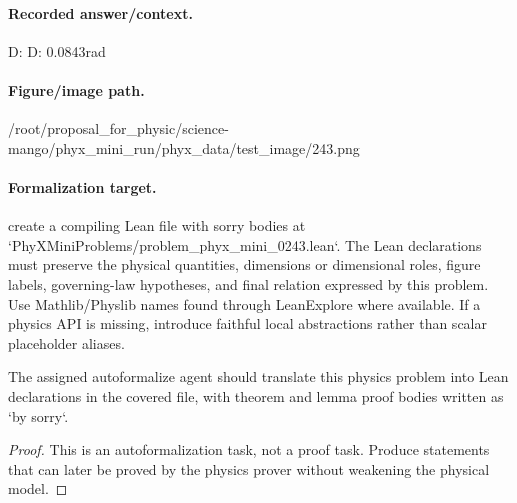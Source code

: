 \paragraph{Recorded answer/context.}
D: D: 0.0843rad

\paragraph{Figure/image path.}
/root/proposal\_for\_physic/science-mango/phyx\_mini\_run/phyx\_data/test\_image/243.png

\paragraph{Formalization target.}
create a compiling Lean file with sorry bodies at `PhyXMiniProblems/problem\_phyx\_mini\_0243.lean`. The Lean declarations must preserve the physical quantities, dimensions or dimensional roles, figure labels, governing-law hypotheses, and final relation expressed by this problem.
Use Mathlib/Physlib names found through LeanExplore where available. If a physics API is missing, introduce faithful local abstractions rather than scalar placeholder aliases.

\begin{theorem}
\label{thm:physics:phyx_mini_0243:target}
The assigned autoformalize agent should translate this physics problem into Lean declarations in the covered file, with theorem and lemma proof bodies written as `by sorry`.
\end{theorem}
\begin{proof}
This is an autoformalization task, not a proof task. Produce statements that can later be proved by the physics prover without weakening the physical model.
\end{proof}

